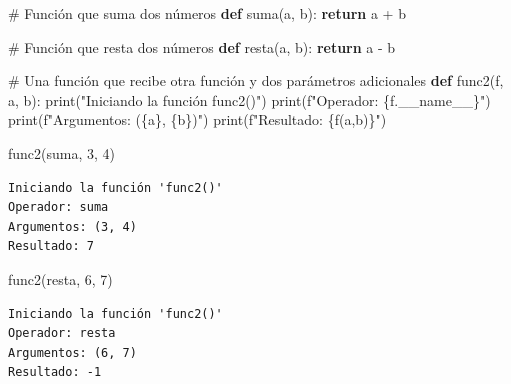 \documentclass[
  spanish,
  letterpaper,
]{scrbook}
\newenvironment{Shaded}{\begin{snugshade}}{\end{snugshade}}
\newcommand{\BuiltInTok}[1]{\textcolor[rgb]{0.00,0.23,0.31}{#1}}
\newcommand{\CommentTok}[1]{\textcolor[rgb]{0.37,0.37,0.37}{#1}}
\newcommand{\ControlFlowTok}[1]{\textcolor[rgb]{0.00,0.23,0.31}{\textbf{#1}}}
\newcommand{\DecValTok}[1]{\textcolor[rgb]{0.68,0.00,0.00}{#1}}
\newcommand{\KeywordTok}[1]{\textcolor[rgb]{0.00,0.23,0.31}{\textbf{#1}}}
\newcommand{\NormalTok}[1]{\textcolor[rgb]{0.00,0.23,0.31}{#1}}
\newcommand{\OperatorTok}[1]{\textcolor[rgb]{0.37,0.37,0.37}{#1}}
\newcommand{\SpecialCharTok}[1]{\textcolor[rgb]{0.37,0.37,0.37}{#1}}
\newcommand{\SpecialStringTok}[1]{\textcolor[rgb]{0.13,0.47,0.30}{#1}}
\newcommand{\StringTok}[1]{\textcolor[rgb]{0.13,0.47,0.30}{#1}}
\newcommand{\VariableTok}[1]{\textcolor[rgb]{0.07,0.07,0.07}{#1}}
\theoremstyle{definition}
\theoremstyle{remark}
\begin{document}
\begin{Shaded}
\begin{Highlighting}[]
\CommentTok{\# Función que suma dos números}
\KeywordTok{def}\NormalTok{ suma(a, b):}
    \ControlFlowTok{return}\NormalTok{ a }\OperatorTok{+}\NormalTok{ b}

\CommentTok{\# Función que resta dos números}
\KeywordTok{def}\NormalTok{ resta(a, b):}
    \ControlFlowTok{return}\NormalTok{ a }\OperatorTok{{-}}\NormalTok{ b}

\CommentTok{\# Una función que recibe otra función y dos parámetros adicionales}
\KeywordTok{def}\NormalTok{ func2(f, a, b):}
    \BuiltInTok{print}\NormalTok{(}\StringTok{"Iniciando la función \textquotesingle{}func2()\textquotesingle{}"}\NormalTok{)}
    \BuiltInTok{print}\NormalTok{(}\SpecialStringTok{f"Operador: }\SpecialCharTok{\{}\NormalTok{f}\SpecialCharTok{.}\VariableTok{\_\_name\_\_}\SpecialCharTok{\}}\SpecialStringTok{"}\NormalTok{)}
    \BuiltInTok{print}\NormalTok{(}\SpecialStringTok{f"Argumentos: (}\SpecialCharTok{\{}\NormalTok{a}\SpecialCharTok{\}}\SpecialStringTok{, }\SpecialCharTok{\{}\NormalTok{b}\SpecialCharTok{\}}\SpecialStringTok{)"}\NormalTok{)}
    \BuiltInTok{print}\NormalTok{(}\SpecialStringTok{f"Resultado: }\SpecialCharTok{\{}\NormalTok{f(a,b)}\SpecialCharTok{\}}\SpecialStringTok{"}\NormalTok{) }
\end{Highlighting}
\end{Shaded}

\begin{Shaded}
\begin{Highlighting}[]
\NormalTok{func2(suma, }\DecValTok{3}\NormalTok{, }\DecValTok{4}\NormalTok{)}
\end{Highlighting}
\end{Shaded}

\begin{verbatim}
Iniciando la función 'func2()'
Operador: suma
Argumentos: (3, 4)
Resultado: 7
\end{verbatim}

\begin{Shaded}
\begin{Highlighting}[]
\NormalTok{func2(resta, }\DecValTok{6}\NormalTok{, }\DecValTok{7}\NormalTok{)}
\end{Highlighting}
\end{Shaded}

\begin{verbatim}
Iniciando la función 'func2()'
Operador: resta
Argumentos: (6, 7)
Resultado: -1
\end{verbatim}
\end{document}

